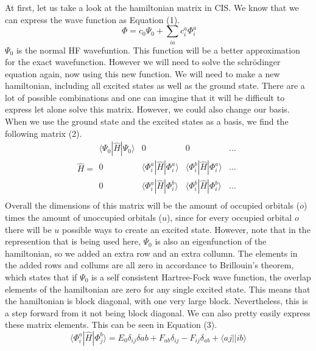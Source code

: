 \documentclass{article}
\begin{document}
At first, let us take a look at the hamiltonian matrix in CIS. We know that we can express the wave function as Equation (1).
\begin{equation} \
    \Phi = c_0\Psi_0 + \sum_{ia} c^a_i\Phi^a_i
\end{equation}
$\Psi_0$ is the normal HF wavefuntion. This function will be a better approximation for the exact wavefunction. However we will need to solve the schrödinger equation again, now using this new function. We will need to make a new hamiltonian, including all excited states as well as the ground state. There are a lot of possible combinations and one can imagine that it will be difficult to express let alone solve this matrix. However, we could also change our basis. When we use the ground state and the excited states as a basis, we find the following matrix (2).
\begin{equation}
    \hat{H} = \begin{matrix}
                    \langle \Psi_0 |\hat{H}|\Psi_0 \rangle & 0 & 0 & \dots \\  
                    0 & \langle \Phi_i^a |\hat{H}|\Phi_i^a \rangle & \langle \Phi_i^b |\hat{H}|\Phi_i^a \rangle & \dots\\
                    0 & \langle \Phi_i^a |\hat{H}|\Phi_i^b \rangle & \langle \Phi_i^b |\hat{H}|\Phi_i^b \rangle & \dots\\
                \end{matrix}
\end{equation}
Overall the dimensions of this matrix will be the amount of occupied orbitals ($o$) times the amount of unoccupied orbitals ($u$), since for every occupied orbital $o$ there will be $u$ possible ways to create an excited state. However, note that in the represention that is being used here, $\Psi_0$ is also an eigenfunction of the hamiltonian, so we added an extra row and an extra collumn. The elements in the added rows and collums are all zero in accordance to Brillouin's theorem, which states that if $\Psi_0$ is a self consistent Hartree-Fock wave function, the overlap elements of the hamiltonian are zero for any single excited state. This means that the hamiltonian is block diagonal, with one very large block. Nevertheless, this is a step forward from it not being block diagonal. We can also pretty easily express these matrix elements. This can be seen in Equation (3).
\begin{equation}\tag{3}
\langle \Phi_i^a |\hat{H}| \Phi_j^b \rangle = E_0\delta_{ij}\delta{ab} + F_{ab}\delta_{ij} - F_{ij}\delta_{ab} + \langle aj|| ib \rangle
\end{equation}
\end{document}
